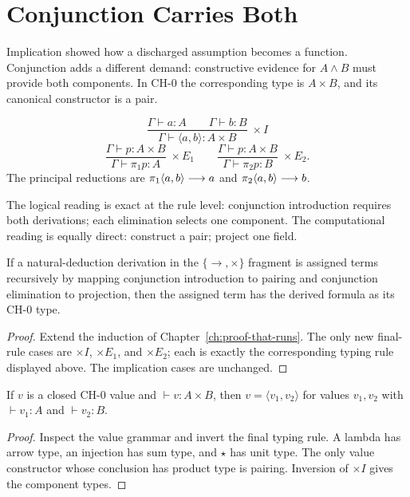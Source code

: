 \chapter{Conjunction Carries Both}
\label{ch:conjunction}

Implication showed how a discharged assumption becomes a function. Conjunction adds a different demand: constructive evidence for $A\land B$ must provide both components. In $\mathrm{CH}\text{-}0$ the corresponding type is $A\times B$, and its canonical constructor is a pair.

\begin{formal}[title={Product rules}]
\[
\frac{\Gamma\vdash a:A\qquad\Gamma\vdash b:B}{\Gamma\vdash\langle a,b\rangle:A\times B}\;\times I
\]
\[
\frac{\Gamma\vdash p:A\times B}{\Gamma\vdash\pi_1 p:A}\;\times E_1
\qquad
\frac{\Gamma\vdash p:A\times B}{\Gamma\vdash\pi_2 p:B}\;\times E_2.
\]
The principal reductions are $\pi_1\langle a,b\rangle\mathrel{\longrightarrow} a$ and $\pi_2\langle a,b\rangle\mathrel{\longrightarrow} b$.
\end{formal}

The logical reading is exact at the rule level: conjunction introduction requires both derivations; each elimination selects one component. The computational reading is equally direct: construct a pair; project one field.



\begin{proposition}
If a natural-deduction derivation in the $\{\to,\times\}$ fragment is assigned terms recursively by mapping conjunction introduction to pairing and conjunction elimination to projection, then the assigned term has the derived formula as its $\mathrm{CH}\text{-}0$ type.
\end{proposition}
\begin{proof}
Extend the induction of Chapter~\ref{ch:proof-that-runs}. The only new final-rule cases are $\times I$, $\times E_1$, and $\times E_2$; each is exactly the corresponding typing rule displayed above. The implication cases are unchanged.
\end{proof}

\begin{lemma}
If $v$ is a closed $\mathrm{CH}\text{-}0$ value and $\vdash v:A\times B$, then $v=\langle v_1,v_2\rangle$ for values $v_1,v_2$ with $\vdash v_1:A$ and $\vdash v_2:B$.
\end{lemma}
\begin{proof}
Inspect the value grammar and invert the final typing rule. A lambda has arrow type, an injection has sum type, and $\star$ has unit type. The only value constructor whose conclusion has product type is pairing. Inversion of $\times I$ gives the component types.
\end{proof}

